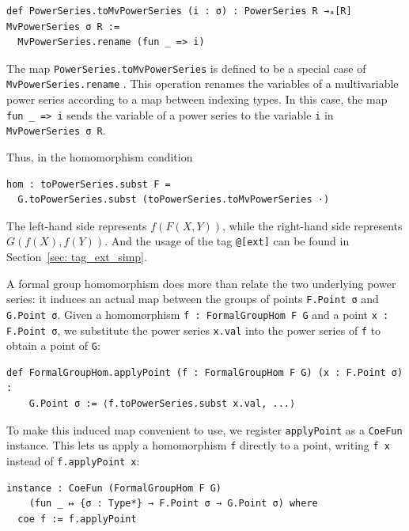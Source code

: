 \begin{lstlisting}
def PowerSeries.toMvPowerSeries (i : σ) : PowerSeries R →ₐ[R] MvPowerSeries σ R :=
  MvPowerSeries.rename (fun _ => i)
\end{lstlisting}

The map \lstinline|PowerSeries.toMvPowerSeries|
is defined to be a special case of
\lstinline|MvPowerSeries.rename|
\href{https://leanprover-community.github.io/mathlib4_docs/Mathlib/RingTheory/MvPowerSeries/Rename.html#MvPowerSeries.rename}{\faExternalLink}.
This operation renames the variables of a multivariable power series
according to a map between indexing types.  In this case, the map
\lstinline|fun _ => i|
sends the variable of a power series to the variable
\lstinline|i| in \lstinline|MvPowerSeries σ R|.


Thus, in the homomorphism condition
\begin{lstlisting}
hom : toPowerSeries.subst F =
  G.toPowerSeries.subst (toPowerSeries.toMvPowerSeries ·)
\end{lstlisting}

The left-hand side represents $f(F(X,Y))$, while the right-hand side
represents $G(f(X), f(Y))$. And the usage of the tag \lstinline|@[ext]|
can be found in Section~\ref{sec: tag_ext_simp}.

A formal group homomorphism does more than relate the two underlying
power series: it induces an actual map between the groups of points
\lstinline|F.Point σ| and \lstinline|G.Point σ|.  Given a homomorphism
\lstinline|f : FormalGroupHom F G| and a point \lstinline|x : F.Point σ|,
we substitute the power series \lstinline|x.val| into the power series of
\lstinline|f| to obtain a point of \lstinline|G|:

\begin{lstlisting}
def FormalGroupHom.applyPoint (f : FormalGroupHom F G) (x : F.Point σ) :
    G.Point σ := ⟨f.toPowerSeries.subst x.val, ...⟩
\end{lstlisting}

To make this induced map convenient to use, we register
\lstinline|applyPoint| as a \lstinline|CoeFun| instance.  This lets us
apply a homomorphism \lstinline|f| directly to a point, writing
\lstinline|f x| instead of \lstinline|f.applyPoint x|:

\begin{lstlisting}
instance : CoeFun (FormalGroupHom F G)
    (fun _ ↦ {σ : Type*} → F.Point σ → G.Point σ) where
  coe f := f.applyPoint
\end{lstlisting}

